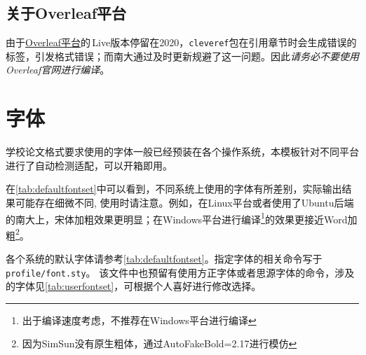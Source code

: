 \subsection{关于Overleaf平台}

由于\href{https://www.overleaf.com/}{Overleaf平台}的\,Live版本停留在2020，\texttt{cleveref}包在引用章节时会生成错误的标签，引发格式错误；而南大通过及时更新规避了这一问题。因此\emph{请务必不要使用Overleaf官网进行编译}。

\section{字体}

学校论文格式要求使用的字体一般已经预装在各个操作系统，本模板针对不同平台进行了自动检测适配，可以开箱即用。

在\cref{tab:defaultfontset}中可以看到，不同系统上使用的字体有所差别，实际输出结果可能存在细微不同, 使用时请注意。例如，在Linux平台或者使用了Ubuntu后端的南大上，宋体加粗效果更明显；在Windows平台进行编译\footnote{出于编译速度考虑，不推荐在Windows平台进行编译}的效果更接近Word加粗\footnote{因为SimSun没有原生粗体，通过AutoFakeBold=2.17进行模仿}。

    
       




各个系统的默认字体请参考\cref{tab:defaultfontset}。指定字体的相关命令写于\texttt{profile/font.sty}。
该文件中也预留有使用方正字体或者思源字体的命令，涉及的字体见\cref{tab:userfontset}，可根据个人喜好进行修改选择。

